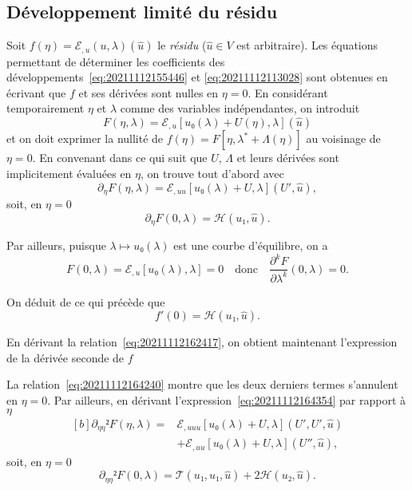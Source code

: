\documentclass[12pt, final]{amsart}
\begin{document}
\subsection{Développement limité du résidu}
\label{sec:20211112182000}

Soit \(f(η)=ℰ_{,u}(u, \lambda)(\hat{u})\) le \emph{résidu}
(\(\hat{u}∈ V\) est arbitraire). Les équations permettant de déterminer les
coefficients des développements~\eqref{eq:20211112155446} et
\eqref{eq:20211112113028} sont obtenues en écrivant que \(f\) et ses dérivées
sont nulles en \(η=0\). En considérant temporairement \(η\) et
\(\lambda\) comme des variables indépendantes, on introduit
\begin{equation}
  F(η, \lambda)=ℰ_{,u}[u₀(\lambda)+U(η), \lambda](\hat{u})
\end{equation}
et on doit exprimer la nullité de
\(f(η)=F[η, \lambda^\ast+\Lambda(η)]\) au voisinage de \(η=0\). En
convenant dans ce qui suit que \(U\), \(\Lambda\) et leurs dérivées sont
implicitement évaluées en \(η\), on trouve tout d'abord
avec
\begin{equation}
  \label{eq:20211112164354}
  \partial_η F(η, \lambda)
  =ℰ_{,uu}[u₀(\lambda)+U, \lambda](U', \hat{u}),
\end{equation}
soit, en \(η=0\)
\begin{equation}
  \label{eq:20211112165323}
  \partial_η F(0, \lambda)=\mathcal H(u₁, \hat{u}).
\end{equation}

Par ailleurs, puisque \(\lambda\mapsto u₀(\lambda)\) est une courbe d'équilibre, on a
\begin{equation}
  \label{eq:20211112164240}
  F(0, \lambda)=ℰ_{,u}[u₀(\lambda), \lambda]=0
  \quad\text{donc}\quad
  \frac{\partial^kF}{\partial\lambda^k}(0, \lambda)=0.
\end{equation}

On déduit de ce qui précède que
\begin{equation}
  \label{eq:20211112182300}
  f'(0)=\mathcal H(u₁, \hat{u}).
\end{equation}

En dérivant la relation~\eqref{eq:20211112162417}, on obtient maintenant l'expression de la dérivée seconde de \(f\)

La relation~\eqref{eq:20211112164240} montre que les deux derniers termes
s'annulent en \(η=0\). Par ailleurs, en dérivant
l'expression~\eqref{eq:20211112164354} par rapport à \(η\)
\begin{equation}
  \label{eq:20211112172446}
  \begin{aligned}[b]
    \partial_{ηη}²F(η, \lambda)={}&
    ℰ_{,uuu}[u₀(\lambda)+U, \lambda](U', U', \hat{u})\\
    &+ℰ_{,uu}[u₀(\lambda)+U, \lambda](U'', \hat{u}),
  \end{aligned}
\end{equation}
soit, en \(η=0\)
\begin{equation}
  \label{eq:20211112165830}
  \partial_{ηη}²F(0, \lambda)=\mathcal T(u₁, u₁, \hat{u})
  +2\mathcal H(u₂, \hat{u}).
\end{equation}
\end{document}

